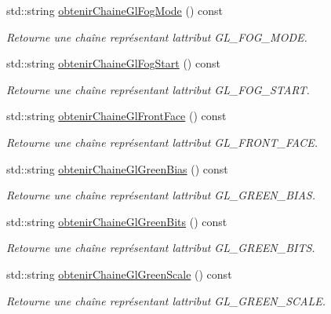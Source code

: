 \begin{DoxyCompactItemize}
std\+::string \hyperlink{group__utilitaire_ga1f28b3ec34f9bd4a2080e1252ca64d57}{obtenir\+Chaine\+Gl\+Fog\+Mode} () const 
\begin{DoxyCompactList}\small\item\em Retourne une chaîne représentant l\textquotesingle{}attribut G\+L\+\_\+\+F\+O\+G\+\_\+\+M\+O\+D\+E. \end{DoxyCompactList}\item 
std\+::string \hyperlink{group__utilitaire_ga7063764912254ec440429aee9e8c3f83}{obtenir\+Chaine\+Gl\+Fog\+Start} () const 
\begin{DoxyCompactList}\small\item\em Retourne une chaîne représentant l\textquotesingle{}attribut G\+L\+\_\+\+F\+O\+G\+\_\+\+S\+T\+A\+R\+T. \end{DoxyCompactList}\item 
std\+::string \hyperlink{group__utilitaire_ga5843f630d530a2112407e19b540e3c42}{obtenir\+Chaine\+Gl\+Front\+Face} () const 
\begin{DoxyCompactList}\small\item\em Retourne une chaîne représentant l\textquotesingle{}attribut G\+L\+\_\+\+F\+R\+O\+N\+T\+\_\+\+F\+A\+C\+E. \end{DoxyCompactList}\item 
std\+::string \hyperlink{group__utilitaire_gabb435ce9e5ba38406d8c429a5a0510ed}{obtenir\+Chaine\+Gl\+Green\+Bias} () const 
\begin{DoxyCompactList}\small\item\em Retourne une chaîne représentant l\textquotesingle{}attribut G\+L\+\_\+\+G\+R\+E\+E\+N\+\_\+\+B\+I\+A\+S. \end{DoxyCompactList}\item 
std\+::string \hyperlink{group__utilitaire_ga418e82a0a01a9dfe598780e602b41b2f}{obtenir\+Chaine\+Gl\+Green\+Bits} () const 
\begin{DoxyCompactList}\small\item\em Retourne une chaîne représentant l\textquotesingle{}attribut G\+L\+\_\+\+G\+R\+E\+E\+N\+\_\+\+B\+I\+T\+S. \end{DoxyCompactList}\item 
std\+::string \hyperlink{group__utilitaire_ga933583938ec361ea302f25dd1323b541}{obtenir\+Chaine\+Gl\+Green\+Scale} () const 
\begin{DoxyCompactList}\small\item\em Retourne une chaîne représentant l\textquotesingle{}attribut G\+L\+\_\+\+G\+R\+E\+E\+N\+\_\+\+S\+C\+A\+L\+E. \end{DoxyCompactList}\item 

\end{DoxyCompactItemize}
